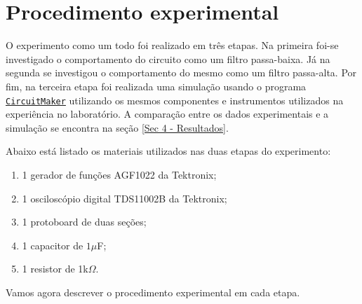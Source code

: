 \documentclass[letterpaper, 12pt]{article}
\begin{document}
\section{Procedimento experimental}\label{Sec 3 - Experimento}
O experimento como um todo foi realizado em três etapas. Na primeira foi-se investigado o comportamento do circuito como um filtro passa-baixa. Já na segunda se investigou o comportamento do mesmo como um filtro passa-alta. Por fim, na terceira etapa foi realizada uma simulação usando o programa \href{https://docente.ifrn.edu.br/leonardoteixeira/links/instalador-do-circuitmaker-student/view}{\texttt{CircuitMaker}} utilizando os mesmos componentes e instrumentos utilizados na experiência no laboratório. A comparação entre os dados experimentais e a simulação se encontra na seção \ref{Sec 4 - Resultados}. 

Abaixo está listado os materiais utilizados nas duas etapas do experimento:
\begin{enumerate}
    \item 1 gerador de funções AGF1022 da Tektronix;
    \item 1 osciloscópio digital TDS11002B da Tektronix;
    \item 1 protoboard de duas seções;
    \item 1 capacitor de $1\mu$F;
    \item 1 resistor de 1k$\Omega$.
\end{enumerate}

Vamos agora descrever o procedimento experimental em cada etapa.
\end{document}

